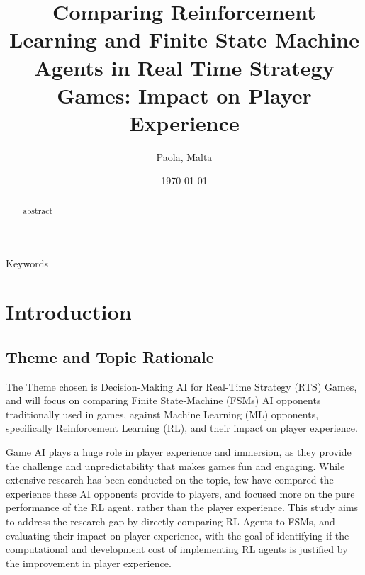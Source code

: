 \documentclass[conference]{IEEEtran}
\begin{document}
\title{Comparing Reinforcement Learning and Finite State Machine Agents in Real Time Strategy Games: Impact on Player Experience}

\author{
Paola, Malta
}

\date{\today}

\maketitle

\begin{abstract}
abstract
\end{abstract}

\begin{IEEEkeywords}
Keywords
\end{IEEEkeywords}

\section{Introduction}


\subsection{Theme and Topic Rationale}

The Theme chosen is Decision-Making AI for Real-Time Strategy (RTS) Games, and will focus on comparing Finite State-Machine (FSMs) AI opponents traditionally used in games, against Machine Learning (ML) opponents, specifically 
Reinforcement Learning (RL), and their impact on player experience. 

Game AI plays a huge role in player experience and immersion, as they provide the challenge and unpredictability that makes games fun and engaging.
While extensive research has been conducted on the topic, few have compared the experience these AI opponents provide to players, and focused more on the pure performance of the RL agent, rather than the
player experience. This study aims to address the research gap by directly comparing RL Agents to FSMs, and evaluating their impact on player experience, with the goal of identifying if the computational
and development cost of implementing RL agents is justified by the improvement in player experience.
\end{document}
